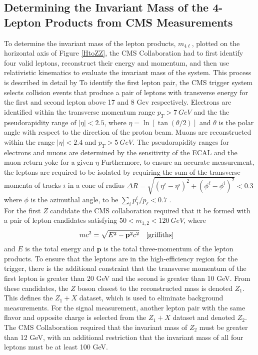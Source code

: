 \documentclass[12pt]{article}
\newcommand{\npar}{\\[0.5cm] \noindent}
\begin{document}
\subsection{Determining the Invariant Mass of the 4-Lepton Products from CMS Measurements}

To determine the invariant mass of the lepton products, $m_{4 \ell}$, plotted on the horizontal axis of Figure \ref{HtoZZ}, the CMS Collaboration had to first identify four valid leptons, reconstruct their energy and momentum, and then use relativistic kinematics to evaluate the invariant mass of the system. This process is described in detail by  To identify the first lepton pair, the CMS trigger system selects collision events that produce a pair of leptons with transverse energy for the first and second lepton above 17 and 8 Gev respectively. Electrons are identified within the transverse momentum range $p_T > \SI{7}{GeV}$ and the the pseudorapidity range of $|\eta| < 2.5$, where $\eta = \ln[\tan(\theta/2)]$ and $\theta$ is the polar angle with respect to the direction of the proton beam. Muons are reconstructed within the range $|\eta| < 2.4$ and $p_T > \SI{5}{GeV}$. The pseudorapidity ranges for electrons and muons are determined by the sensitivity of the ECAL and the muon return yoke for a given $\eta$ Furthermore, to ensure an accurate measurement, the leptons are required to be isolated by requiring the sum of the transverse momenta of tracks $i$ in a cone of radius $\Delta R = \sqrt{(\eta^\ell - \eta^i)^2 + (\phi^\ell - \phi^i)^2} < 0.3$ where $\phi$ is the azimuthal angle, to be $\sum_ip_T^i/p_\ell < 0.7$ \cite{higgs_golden_search}. \npar
For the first $Z$ candidate the CMS collaboration required that it be formed with a pair of lepton candidates satisfying $50 < m_{1,2} < \SI{120}{GeV}$, where
\begin{align}
	mc^2 &= \sqrt{E^2 - \mathbf{p}^2c^2} \quad \cite{griffiths}
\end{align}
and $E$ is the total energy and $\mathbf{p}$ is the total three-momentum of the lepton products. To ensure that the leptons are in the high-efficiency region for the trigger, there is the additional constraint that the transverse momentum of the first lepton is greater than 20 GeV and the second is greater than 10 GeV. From these candidates, the $Z$ boson closest to the reconstructed mass is denoted $Z_1$. This defines the $Z_1 + X$ dataset, which is used to eliminate background measurements.
For the signal measurement, another lepton pair with the same flavor and opposite charge is selected from the $Z_1 + X$ dataset and denoted $Z_2$. The CMS Collaboration required that the invariant mass of $Z_2$ must be greater than 12 GeV, with an additional restriction that the invariant mass of all four leptons must be at least 100 GeV.
\end{document}
